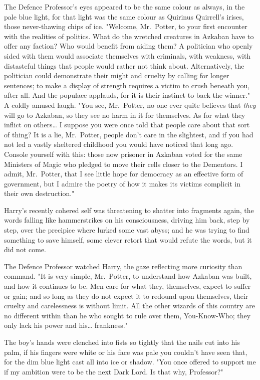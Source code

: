 The Defence Professor's eyes appeared to be the same colour as always, in the
pale blue light, for that light was the same colour as Quirinus Quirrell's
irises, those never-thawing chips of ice. "Welcome, Mr.~Potter, to your first
encounter with the realities of politics. What do the wretched creatures in
Azkaban have to offer any faction? Who would benefit from aiding them? A
politician who openly sided with them would associate themselves with
criminals, with weakness, with distasteful things that people would rather not
think about. Alternatively, the politician could demonstrate their might and
cruelty by calling for longer sentences; to make a display of strength requires
a victim to crush beneath you, after all. And the populace applauds, for it is
their instinct to back the winner." A coldly amused laugh. "You see,
Mr.~Potter, no one ever quite believes that \emph{they} will go to Azkaban, so
they see no harm in it for themselves. As for what they inflict on
others{\ldots} I suppose you were once told that people care about that sort of
thing? It is a lie, Mr.~Potter, people don't care in the slightest, and if you
had not led a vastly sheltered childhood you would have noticed that long ago.
Console yourself with this: those now prisoner in Azkaban voted for the same
Ministers of Magic who pledged to move their cells closer to the Dementors. I
admit, Mr.~Potter, that I see little hope for democracy as an effective form of
government, but I admire the poetry of how it makes its victims complicit in
their own destruction."

Harry's recently cohered self was threatening to shatter into fragments again,
the words falling like hammerstrikes on his consciousness, driving him back,
step by step, over the precipice where lurked some vast abyss; and he was
trying to find something to save himself, some clever retort that would refute
the words, but it did not come.

The Defence Professor watched Harry, the gaze reflecting more curiosity than
command. "It is very simple, Mr.~Potter, to understand how Azkaban was built,
and how it continues to be. Men care for what they, themselves, expect to
suffer or gain; and so long as they do not expect it to redound upon
themselves, their cruelty and carelessness is without limit. All the other
wizards of this country are no different within than he who sought to rule over
them, You-Know-Who; they only lack his power and his{\ldots} frankness."

The boy's hands were clenched into fists so tightly that the nails cut into his
palm, if his fingers were white or his face was pale you couldn't have seen
that, for the dim blue light cast all into ice or shadow. "You once offered to
support me if my ambition were to be the next Dark Lord. Is that why,
Professor?"


